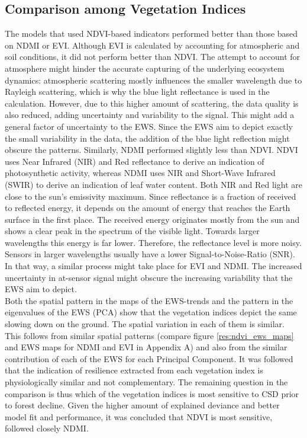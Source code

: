 \subsection{Comparison among Vegetation Indices}\label{disc:vegind}
The models that used NDVI-based indicators performed better than those based on NDMI or EVI. Although EVI is calculated by accounting for atmospheric and soil conditions, it did not perform better than NDVI. The attempt to account for atmosphere might hinder the accurate capturing of the underlying ecosystem dynamics: atmospheric scattering mostly influences the smaller wavelength due to Rayleigh scattering, which is why the blue light reflectance is used in the calculation. However, due to this higher amount of scattering, the data quality is also reduced, adding uncertainty and variability to the signal. This might add a general factor of uncertainty to the EWS. Since the EWS aim to depict exactly the small variability in the data, the addition of the blue light reflection might obscure the patterns. Similarly, NDMI performed slightly less than NDVI. NDVI uses Near Infrared (NIR) and Red reflectance to derive an indication of photosynthetic activity, whereas NDMI uses NIR and Short-Wave Infrared (SWIR) to derive an indication of leaf water content. Both NIR and Red light are close to the sun's emissivity maximum. Since reflectance is a fraction of received to reflected energy, it depends on the amount of energy that reaches the Earth surface in the first place. The received energy originates mostly from the sun and shows a clear peak in the spectrum of the visible light. Towards larger wavelengths this energy is far lower. Therefore, the reflectance level is more noisy. Sensors in larger wavelengths usually have a lower Signal-to-Noise-Ratio (SNR). In that way, a similar process might take place for EVI and NDMI. The increased uncertainty in at-sensor signal might obscure the increasing variability that the EWS aim to depict.\\
Both the spatial pattern in the maps of the EWS-trends and the pattern in the eigenvalues of the EWS (PCA) show that the vegetation indices depict the same slowing down on the ground. The spatial variation in each of them is similar. This follows from similar spatial patterns (compare figure \ref{res:ndvi_ews_maps} and EWS maps for NDMI and EVI in Appendix A) and also from the similar contribution of each of the EWS for each Principal Component. It was followed that the indication of resilience extracted from each vegetation index is physiologically similar and not complementary. The remaining question in the comparison is thus which of the vegetation indices is most sensitive to CSD prior to forest decline. Given the higher amount of explained deviance and better model fit and performance, it was concluded that NDVI is most sensitive, followed closely NDMI.\\
